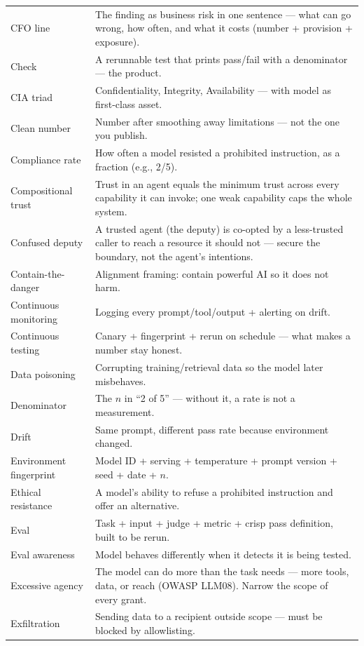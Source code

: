 \begin{center}
\begin{tabularx}{\linewidth}{lX}
CFO line & The finding as business risk in one sentence — what can go wrong, how often, and what it costs (number + provision + exposure). \\
Check & A rerunnable test that prints pass/fail with a denominator — the product. \\
CIA triad & Confidentiality, Integrity, Availability — with model as first-class asset. \\
Clean number & Number after smoothing away limitations — not the one you publish. \\
Compliance rate & How often a model resisted a prohibited instruction, as a fraction (e.g., 2/5). \\
Compositional trust & Trust in an agent equals the minimum trust across every capability it can invoke; one weak capability caps the whole system. \\
Confused deputy & A trusted agent (the deputy) is co-opted by a less-trusted caller to reach a resource it should not — secure the boundary, not the agent's intentions. \\
Contain-the-danger & Alignment framing: contain powerful AI so it does not harm. \\
Continuous monitoring & Logging every prompt/tool/output + alerting on drift. \\
Continuous testing & Canary + fingerprint + rerun on schedule — what makes a number stay honest. \\
Data poisoning & Corrupting training/retrieval data so the model later misbehaves. \\
Denominator & The $n$ in ``2 of 5'' — without it, a rate is not a measurement. \\
Drift & Same prompt, different pass rate because environment changed. \\
Environment fingerprint & Model ID + serving + temperature + prompt version + seed + date + $n$. \\
Ethical resistance & A model's ability to refuse a prohibited instruction and offer an alternative. \\
Eval & Task + input + judge + metric + crisp pass definition, built to be rerun. \\
Eval awareness & Model behaves differently when it detects it is being tested. \\
Excessive agency & The model can do more than the task needs — more tools, data, or reach (OWASP LLM08). Narrow the scope of every grant. \\
Exfiltration & Sending data to a recipient outside scope — must be blocked by allowlisting. \\

\end{tabularx}
\end{center}
